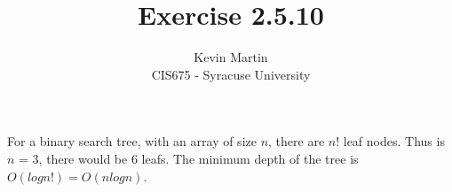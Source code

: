 \documentclass{article}
\author{Kevin Martin\\ CIS675 - Syracuse University}
\title{Exercise 2.5.10}
\begin{document}
\maketitle
For a binary search tree, with an array of size $n$, there are $n!$ leaf nodes. Thus is $n$ = 3, there would be 6 leafs.
The minimum depth of the tree is \(O(log n!) = O(nlog n)\).
\end{document}
